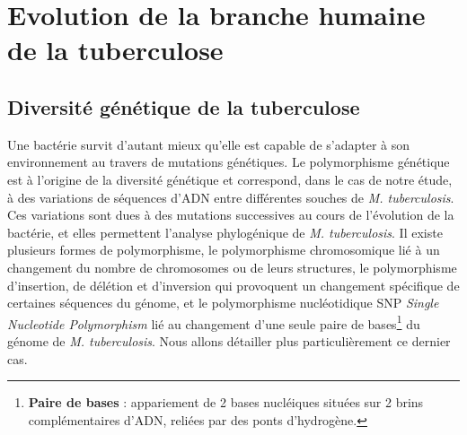 \documentclass[twoside,a4paper,11pt,frenchb,openany]{report}
\begin{document}
\section{Evolution de la branche humaine de la tuberculose}


\subsection{Diversité génétique de la tuberculose}

Une bactérie survit d'autant mieux qu'elle est capable de s'adapter à son environnement au travers de mutations génétiques. Le polymorphisme génétique est à l'origine de la diversité génétique et correspond, dans le cas de notre étude, à des variations de séquences d'ADN entre différentes souches de \textit{M. tuberculosis}. Ces variations sont dues à des mutations successives au cours de l'évolution de la bactérie, et elles permettent l'analyse phylogénique de \textit{M. tuberculosis}. Il existe plusieurs formes de polymorphisme, le polymorphisme chromosomique lié à un changement du nombre de chromosomes ou de leurs structures, le polymorphisme d'insertion, de délétion et d'inversion qui provoquent un changement spécifique de certaines séquences du génome, et le polymorphisme nucléotidique SNP \textit{Single Nucleotide Polymorphism} lié au changement d'une seule paire de bases\footnote{\textbf{Paire de bases} : appariement de 2 bases nucléiques situées sur 2 brins complémentaires d'ADN, reliées par des ponts d'hydrogène.} du génome de \textit{M. tuberculosis}. Nous allons détailler plus particulièrement ce dernier cas.
\end{document}
